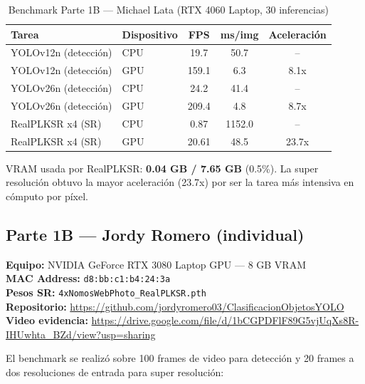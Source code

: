 \documentclass[12pt,a4paper]{article}
\let\oldsubsection\subsection
\renewcommand{\subsection}[1]{\needspace{5\baselineskip}\oldsubsection{#1}}
\begin{document}
\begin{table}[htbp]
  \centering
  \caption{Benchmark Parte 1B — Michael Lata (RTX 4060 Laptop, 30 inferencias)}
  \begin{tabular}{llccc}
    \toprule
    \textbf{Tarea} & \textbf{Dispositivo} & \textbf{FPS} & \textbf{ms/img} & \textbf{Aceleración} \\
    \midrule
    YOLOv12n (detección) & CPU & 19.7  & 50.7   & --    \\
    YOLOv12n (detección) & GPU & 159.1 &  6.3   & 8.1x  \\
    \midrule
    YOLOv26n (detección) & CPU & 24.2  & 41.4   & --    \\
    YOLOv26n (detección) & GPU & 209.4 &  4.8   & 8.7x  \\
    \midrule
    RealPLKSR x4 (SR)   & CPU &  0.87 & 1152.0 & --    \\
    RealPLKSR x4 (SR)   & GPU & 20.61 &  48.5  & 23.7x \\
    \bottomrule
  \end{tabular}
\end{table}

VRAM usada por RealPLKSR: \textbf{0.04 GB / 7.65 GB} (0.5\%). La super resolución obtuvo la mayor aceleración (23.7x) por ser la tarea más intensiva en cómputo por píxel.

\subsection{Parte 1B — Jordy Romero (individual)}

\begin{jordybox}
\textbf{Equipo:} NVIDIA GeForce RTX 3080 Laptop GPU — 8 GB VRAM\\
\textbf{MAC Address:} \texttt{d8:bb:c1:b4:24:3a}\\
\textbf{Pesos SR:} \texttt{4xNomosWebPhoto\_RealPLKSR.pth}\\
\textbf{Repositorio:} \url{https://github.com/jordyromero03/ClasificacionObjetosYOLO}\\
\textbf{Video evidencia:} \url{https://drive.google.com/file/d/1bCGPDFlF89G5vjUqXs8R-IHUwhta_BZd/view?usp=sharing}
\end{jordybox}

El benchmark se realizó sobre 100 frames de video para detección y 20 frames a dos resoluciones de entrada para super resolución:
\end{document}
